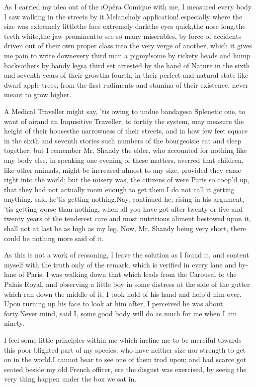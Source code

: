 \documentclass[twoside]{article}
\begin{document}
As I carried my idea out of the \i{Opéra Comique} with me, I measured every
body I saw walking in the streets by it.\tsk Melancholy application!
especially where the size was extremely little\tsk the face extremely
dark\tsk the eyes quick,\tsk the nose long,\tsk the teeth white,\tsk the jaw
prominent\tsk to see so many miserables, by force of accidents driven out of
their own proper class into the very verge of another, which it gives me
pain to write down\tsk every third man a pigmy!\tsk some by rickety heads and
hump backs\tsk others by bandy legs\tsk a third set arrested by the hand of
Nature in the sixth and seventh years of their growth\tsk a fourth, in their
perfect and natural state like dwarf apple trees; from the first
rudiments and stamina of their existence, never meant to grow higher.

A Medical Traveller might say, ’tis owing to undue bandages\tsk a Splenetic
one, to want of air\tsk and an Inquisitive Traveller, to fortify the system,
may measure the height of their houses\tsk the narrowness of their streets,
and in how few feet square in the sixth and seventh stories such numbers
of the bourgeoisie eat and sleep together; but I remember Mr. Shandy the
elder, who accounted for nothing like any body else, in speaking one
evening of these matters, averred that children, like other animals,
might be increased almost to any size, provided they came right into the
world; but the misery was, the citizens of were Paris so coop’d up, that
they had not actually room enough to get them.\tsk I do not call it getting
anything, said he\tsk ’tis getting nothing.\tsk Nay, continued he, rising in his
argument, ’tis getting worse than nothing, when all you have got after
twenty or five and twenty years of the tenderest care and most nutritious
aliment bestowed upon it, shall not at last be as high as my leg.  Now,
Mr. Shandy being very short, there could be nothing more said of it.

As this is not a work of reasoning, I leave the solution as I found it,
and content myself with the truth only of the remark, which is verified
in every lane and by-lane of Paris.  I was walking down that which leads
from the Carousal to the Palais Royal, and observing a little boy in some
distress at the side of the gutter which ran down the middle of it, I
took hold of his hand and help’d him over.  Upon turning up his face to
look at him after, I perceived he was about forty.\tsk Never mind, said I,
some good body will do as much for me when I am ninety.

I feel some little principles within me which incline me to be merciful
towards this poor blighted part of my species, who have neither size nor
strength to get on in the world.\tsk I cannot bear to see one of them trod
upon; and had scarce got seated beside my old French officer, ere the
disgust was exercised, by seeing the very thing happen under the box we
sat in.
\end{document}
